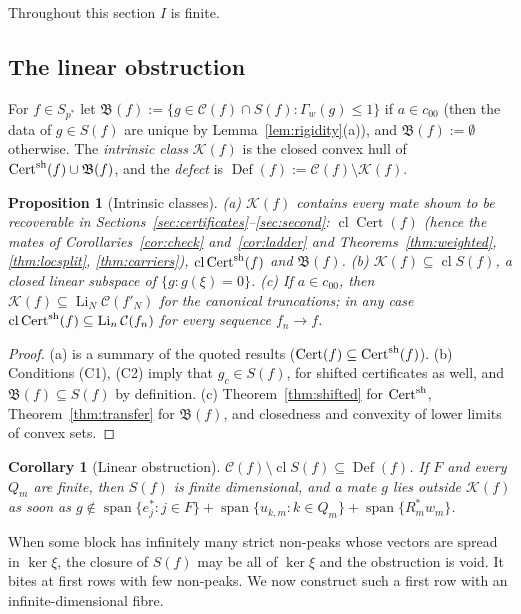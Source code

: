 \documentclass[10pt]{amsart}
\newtheorem{proposition}[theorem]{Proposition}
\newtheorem{corollary}[theorem]{Corollary}
\theoremstyle{definition}
\theoremstyle{remark}
\newcommand{\spn}{\operatorname{span}}
\newcommand{\Cset}{\mathcal C}
\newcommand{\Cert}{\operatorname{Cert}}
\newcommand{\Li}{\operatorname*{Li}}
\newcommand{\cl}{\operatorname{cl}}
\newcommand{\Def}{\operatorname{Def}}
\begin{document}
Throughout this section $I$ is finite.

\subsection{The linear obstruction}
For $f\in S_{p^*}$ let $\mathfrak B(f):=\{g\in\Cset(f)\cap S(f):\Gamma_w(g)
\le1\}$ if $a\in c_{00}$ (then the data of $g\in S(f)$ are unique by
Lemma~\ref{lem:rigidity}(a)), and $\mathfrak B(f):=\emptyset$ otherwise.
The \emph{intrinsic class} $\mathcal K(f)$ is the closed convex hull of
$\Cert^{\rm sh}(f)\cup\mathfrak B(f)$, and the \emph{defect} is
$\Def(f):=\Cset(f)\setminus\mathcal K(f)$.

\begin{proposition}[Intrinsic classes]\label{prop:intrinsic}
\textup{(a)} $\mathcal K(f)$ contains every mate shown to be recoverable in
Sections~\ref{sec:certificates}--\ref{sec:second}: $\cl\Cert(f)$ (hence the
mates of Corollaries~\ref{cor:check} and~\ref{cor:ladder} and
Theorems~\ref{thm:weighted}, \ref{thm:locsplit}, \ref{thm:carriers}),
$\cl\Cert^{\rm sh}(f)$ and $\mathfrak B(f)$.
\textup{(b)} $\mathcal K(f)\subseteq\cl S(f)$, a closed linear subspace of
$\{g:g(\xi)=0\}$.
\textup{(c)} If $a\in c_{00}$, then $\mathcal K(f)\subseteq\Li_N\Cset(f'_N)$
for the canonical truncations; in any case $\cl\Cert^{\rm sh}(f)\subseteq
\Li_n\Cset(f_n)$ for every sequence $f_n\to f$.
\end{proposition}

\begin{proof}
(a) is a summary of the quoted results ($\Cert(f)\subseteq\Cert^{\rm
sh}(f)$).  (b) Conditions (C1), (C2) imply that $g_c\in S(f)$, for
shifted certificates as well, and $\mathfrak B(f)\subseteq S(f)$ by
definition.  (c) Theorem~\ref{thm:shifted} for $\Cert^{\rm sh}$,
Theorem~\ref{thm:transfer} for $\mathfrak B(f)$, and closedness and
convexity of lower limits of convex sets.
\end{proof}

\begin{corollary}[Linear obstruction]\label{cor:linear}
$\Cset(f)\setminus\cl S(f)\subseteq\Def(f)$.  If $F$ and every $Q_m$ are
finite, then $S(f)$ is finite dimensional, and a mate $g$ lies outside
$\mathcal K(f)$ as soon as $g\notin\spn\{e_j^*:j\in F\}+\spn\{u_{k,m}:k\in
Q_m\}+\spn\{R_m^*w_m\}$.
\end{corollary}

When some block has infinitely many strict non-peaks whose vectors are
spread in $\ker\xi$, the closure of $S(f)$ may be all of $\ker\xi$ and the
obstruction is void.  It bites at first rows with few non-peaks.  We now
construct such a first row with an infinite-dimensional fibre.
\end{document}
